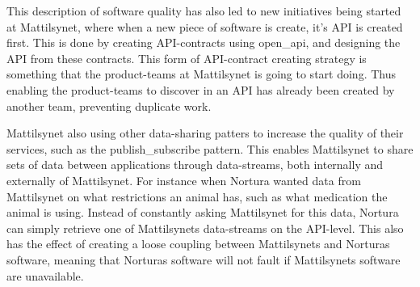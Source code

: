This description of software quality has also led to new initiatives being started at Mattilsynet, where when a new piece of software is create, it's API is created first. This is done by creating API-contracts using \gls{open_api}, and designing the API from these contracts. This form of API-contract creating strategy is something that the product-teams at Mattilsynet is going to start doing. Thus enabling the product-teams to discover in an API has already been created by another team, preventing duplicate work.

Mattilsynet also using other data-sharing patters to increase the quality of their services, such as the \gls{publish_subscribe} pattern. This enables Mattilsynet to share sets of data between applications through data-streams, both internally and externally of Mattilsynet. For instance when Nortura wanted data from Mattilsynet on what restrictions an animal has, such as what medication the animal is using. Instead of constantly asking Mattilsynet for this data, Nortura can simply retrieve one of Mattilsynets data-streams on the API-level. This also has the effect of creating a loose coupling between Mattilsynets and Norturas software, meaning that Norturas software will not fault if Mattilsynets software are unavailable.




